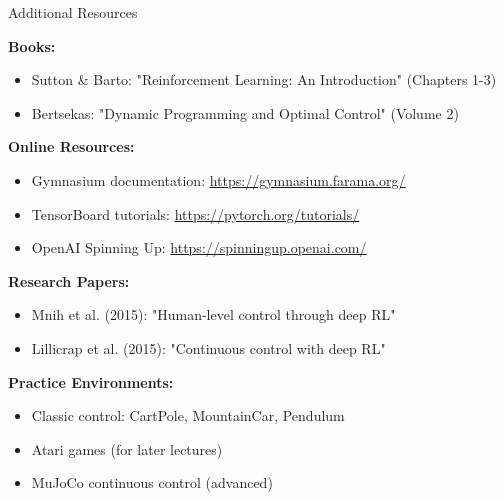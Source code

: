 \documentclass[aspectratio=169,10pt]{beamer}
\begin{document}
\begin{frame}{Additional Resources}

\textbf{Books:}
\begin{itemize}
    \item Sutton \& Barto: "Reinforcement Learning: An Introduction" (Chapters 1-3)
    \item Bertsekas: "Dynamic Programming and Optimal Control" (Volume 2)
\end{itemize}

\vfill

\textbf{Online Resources:}
\begin{itemize}
    \item Gymnasium documentation: \url{https://gymnasium.farama.org/}
    \item TensorBoard tutorials: \url{https://pytorch.org/tutorials/}
    \item OpenAI Spinning Up: \url{https://spinningup.openai.com/}
\end{itemize}

\vfill

\textbf{Research Papers:}
\begin{itemize}
    \item Mnih et al. (2015): "Human-level control through deep RL"
    \item Lillicrap et al. (2015): "Continuous control with deep RL"
\end{itemize}

\vfill

\textbf{Practice Environments:}
\begin{itemize}
    \item Classic control: CartPole, MountainCar, Pendulum
    \item Atari games (for later lectures)
    \item MuJoCo continuous control (advanced)
\end{itemize}

\end{frame}
\end{document}
